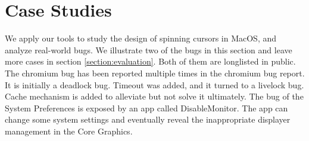 \section{Case Studies}                                                                                                       
We apply our tools to study the design of spinning cursors in MacOS, and analyze real-world bugs.                            
We illustrate two of the bugs in this section and leave more cases in section \ref{section:evaluation}.                  
Both of them are longlisted in public.                                                                                     
The chromium bug has been reported multiple times in the chromium bug report.                                               
It is initially a deadlock bug.                                                                                           
Timeout was added, and it turned to a livelock bug.                                                                         
Cache mechanism is added to alleviate but not solve it ultimately.                                                          
The bug of the System Preferences is exposed by an app called DisableMonitor.                                               
The app can change some system settings and eventually reveal the inappropriate displayer management in the Core Graphics.




